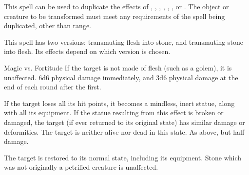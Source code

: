 \begin{spellheader}
    \spellrng{\rngmed}
\end{spellheader}
\begin{spelleffects}
    \spellspecial This spell can be used to duplicate the effects of , , , , , , or . The object or creature to be transformed must meet any requirements of the spell being duplicated, other than range.
\end{spelleffects}
\begin{spellfooter}

\end{spellfooter}

\begin{spellheader}
    \spellrng{\rngmed}
\end{spellheader}
\begin{spelleffects}
    \spellspecial This spell has two versions: transmuting flesh into stone, and transmuting stone into flesh. Its effects depend on which version is chosen.
    \begin{spellattack}{Magic vs. Fortitude}
        \spellspecial If the target is not made of flesh (such as a golem), it is unaffected.
        \spellsuccess 6d6 physical damage immediately, and 3d6 physical damage at the end of each round after the first.

        If the target loses all its hit points, it becomes a mindless, inert statue, along with all its equipment. If the statue resulting from this effect is broken or damaged, the target (if ever returned to its original state) has similar damage or deformities. The target is neither alive nor dead in this state.
        \spellfailure As above, but half damage.

        \spellsuccess The target is restored to its normal state, including its equipment. Stone which was not originally a petrified creature is unaffected.
    \end{spellattack}
\end{spelleffects}
\begin{spellfooter}

\end{spellfooter}


